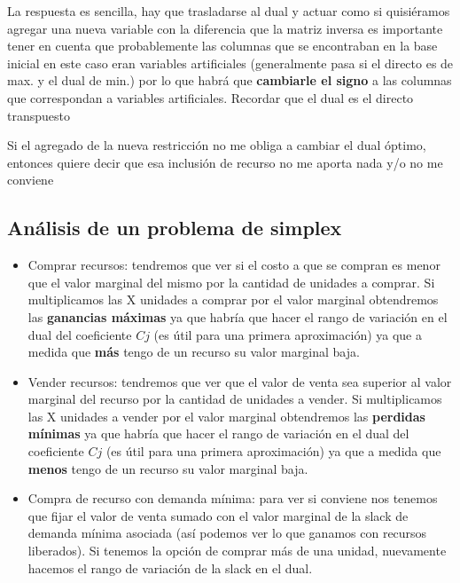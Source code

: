 \documentclass[titlepage,a4paper]{article}
\begin{document}
\vspace{0.5cm}

La respuesta es sencilla, hay que trasladarse al dual y actuar como si quisiéramos agregar una nueva variable con la diferencia que la matriz inversa es importante tener en cuenta que probablemente las columnas que se encontraban en la base inicial en este caso eran variables artificiales (generalmente pasa si el directo es de max. y el dual de min.) por lo que habrá que \textbf{cambiarle el signo} a las columnas que correspondan a variables artificiales. Recordar que el dual es el directo transpuesto

Si el agregado de la nueva restricción no me obliga a cambiar el dual óptimo, entonces quiere decir que esa inclusión de recurso no me aporta nada y/o no me conviene

\vspace{1cm}

\subsection{Análisis de un problema de simplex} 


\begin{itemize}
    \item Comprar recursos: tendremos que ver si el costo a que se compran es menor que el valor marginal del mismo por la cantidad de unidades a comprar. Si multiplicamos las X unidades a comprar por el valor marginal obtendremos las \textbf{ganancias máximas} ya que habría que hacer el rango de variación en el dual del coeficiente $Cj$ (es útil para una primera aproximación) ya que a medida que \textbf{más} tengo de un recurso su valor marginal baja.
    \item Vender recursos: tendremos que ver que el valor de venta sea superior al valor marginal del recurso por la cantidad de unidades a vender. Si multiplicamos las X unidades a vender por el valor marginal obtendremos las \textbf{perdidas mínimas} ya que habría que hacer el rango de variación en el dual del coeficiente $Cj$ (es útil para una primera aproximación) ya que a medida que \textbf{menos} tengo de un recurso su valor marginal baja.
    \item Compra de recurso con demanda mínima: para ver si conviene nos tenemos que fijar el valor de venta sumado con el valor marginal de la slack de demanda mínima asociada (así podemos ver lo que ganamos con recursos liberados). Si tenemos la opción de comprar más de una unidad, nuevamente hacemos el rango de variación de la slack en el dual.
\end{itemize}
\end{document}
